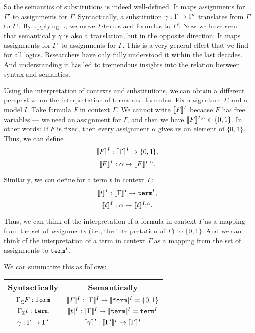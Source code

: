 So the semantics of substitutions is indeed well-defined. It maps assignments for $\Gamma'$ to assignments for $\Gamma$. Syntactically, a substitution $\gamma:\Gamma\rightarrow\Gamma'$ translates from $\Gamma$ to $\Gamma'$: By applying $\gamma$, we move $\Gamma$-terms and formulas to $\Gamma'$. Now we have seen that semantically $\gamma$ is also a translation, but in the opposite direction: It maps assignments for $\Gamma'$ to assignments for $\Gamma$. This is a very general effect that we find for all logics. Researchers have only fully understood it within the last decades. And understanding it has led to tremendous insights into the relation between syntax and semantics.
\medskip

Using the interpretation of contexts and substitutions, we can obtain a different perspective on the interpretation of terms and formulas.
Fix a signature $\Sigma$ and a model $I$. Take formula $F$ in context $\Gamma$. We cannot write $\llbracket F\rrbracket^{I}$ because $F$ has free variables --- we need an assignment for $\Gamma$, and then we have $\llbracket F\rrbracket^{I,\alpha}\in\{0,1\}$. In other words: If $F$ is fixed, then every assignment $\alpha$ gives us an element of $\{0,1\}$. Thus, we can define
 \[\llbracket F\rrbracket^{I}:\llbracket \Gamma\rrbracket^{I} \rightarrow \{0,1\},\]
 \[\llbracket F\rrbracket^{I}:\alpha \mapsto \llbracket F\rrbracket^{I,\alpha}.\]

Similarly, we can define for a term $t$ in context $\Gamma$:
 \[\llbracket t\rrbracket^{I}:\llbracket \Gamma\rrbracket^{I} \rightarrow \mathtt{term}^I,\]
 \[\llbracket t\rrbracket^{I}:\alpha \mapsto \llbracket t\rrbracket^{I,\alpha}.\]

Thus, we can think of the interpretation of a formula in context $\Gamma$ as a mapping from the set of assignments (i.e., the interpretation of $\Gamma$) to $\{0,1\}$. And we can think of the interpretation of a term in context $\Gamma$ as a mapping from the set of assignments to $\mathtt{term}^I$.
\medskip

We can summarize this as follows:
\begin{center}
\begin{tabular}{|c|c|}
\hline
Syntactically  & Semantically \\ \hline
$\Gamma^{}_{\Sigma}F:\mathtt{form}$ &  $\llbracket F\rrbracket^{I}:\llbracket \Gamma\rrbracket^{I}\rightarrow \llbracket \mathtt{form}\rrbracket^{I}=\{0,1\}$ \\[0.2cm]

$\Gamma^{}_{\Sigma}t:\mathtt{term}$  &  $\llbracket t\rrbracket^{I}:\llbracket \Gamma\rrbracket^{I}\rightarrow \llbracket \mathtt{term}\rrbracket^{I}=\mathtt{term}^I$ \\[0.2cm]

$\gamma : \Gamma\rightarrow\Gamma'$ & $\llbracket \gamma\rrbracket^{I} : \llbracket \Gamma'\rrbracket^{I} \rightarrow \llbracket \Gamma\rrbracket^{I}$ \\[0.2cm]
\hline
\end{tabular}
\end{center}
\medskip

